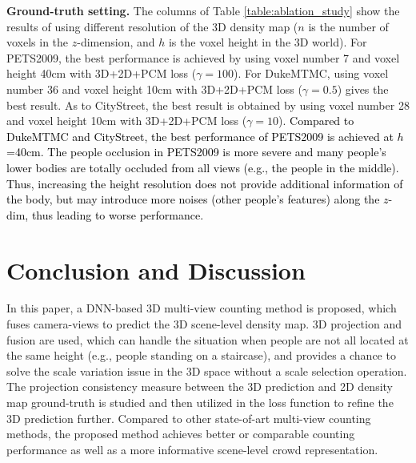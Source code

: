 \documentclass[letterpaper]{article} %
\newcommand{\NOTE}[1]{\textcolor{black}{}}
\newcommand{\zq}[1]{\textcolor{black}{#1}} %
\begin{document}
\textbf{Ground-truth setting.}
The columns of Table \ref{table:ablation_study} show the results of using different resolution of the 3D density map ($n$ is the number of voxels in the $z$-dimension, and $h$ is the voxel height in the 3D world).
For PETS2009, the best performance is achieved by using voxel number 7 and voxel height 40cm with 3D+2D+PCM loss ($\gamma=100$). For DukeMTMC, using voxel number 36 and voxel height 10cm with 3D+2D+PCM loss ($\gamma=0.5$) gives the best result. As to CityStreet, the best result is obtained by using voxel number 28 and voxel height 10cm with 3D+2D+PCM loss ($\gamma=10$). \zq{Compared to DukeMTMC and CityStreet, the best performance of PETS2009 is achieved at $h$=40cm. The people occlusion in PETS2009 is more severe and many people's lower bodies are totally occluded from all views (e.g., the people in the middle).
Thus, increasing the height resolution does not provide additional information of the body, but may introduce more noises (other people's features) along the $z$-dim, thus leading to worse performance.}

\section{Conclusion and Discussion}
\par In this paper, a DNN-based 3D multi-view counting method is proposed, which fuses camera-views to predict the 3D scene-level density map. 3D projection and fusion are used, which can handle the situation when people are not all located at the same height (e.g., %
people standing on a staircase),
and provides a chance to solve the scale variation issue in the 3D space without a scale selection operation. The projection consistency measure between the 3D prediction and 2D density map ground-truth is studied and then utilized in the loss function to refine the 3D prediction further.
Compared to other state-of-art multi-view counting methods, the proposed method  achieves better or comparable counting performance as well as a more informative scene-level crowd representation.
\end{document}
